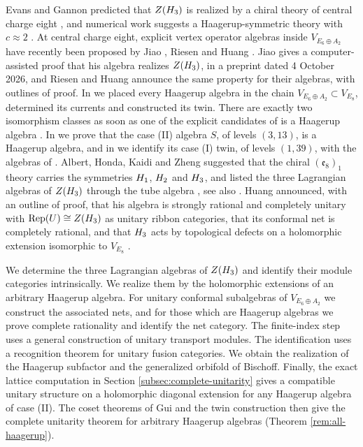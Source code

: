 \documentclass[leqno]{article}
\let\cal\relax
\newcommand{\cal}{\mathcal}
\DeclareMathOperator{\Rep}{Rep} %
\numberwithin{equation}{section}
\begin{document}
Evans and Gannon predicted that $Z(\cal H_3)$ is realized by a chiral theory of central charge eight \cite{EvG11}, and numerical work suggests a Haagerup-symmetric theory with $c \approx 2$ \cite{HL+22,V+22}. At central charge eight, explicit vertex operator algebras inside $V_{E_6 \oplus A_2}$ have recently been proposed by Jiao \cite{Jia26}, Riesen \cite{Rie26} and Huang \cite{Hua26}. Jiao gives a computer-assisted proof that his algebra realizes $Z(\cal H_3)$, in a preprint dated 4 October 2026, and Riesen and Huang announce the same property for their algebras, with outlines of proof. In \cite{Arh26} we placed every Haagerup algebra in the chain $V_{E_6 \oplus A_2} \subset V_{E_8}$, determined its currents and constructed its twin. There are exactly two isomorphism classes as soon as one of the explicit candidates of \cite{Jia26,Rie26} is a Haagerup algebra \cite[Theorems 12.3 and 12.4]{Arh26}. In \cite[Theorem 6.1]{ArhIII} we prove that the case (II) algebra $S$, of levels $(3,13)$, is a Haagerup algebra, and in \cite[Theorem 7.13(1)]{ArhIII} we identify its case (I) twin, of levels $(1,39)$, with the algebras of \cite{Rie26,Hua26}. Albert, Honda, Kaidi and Zheng suggested that the chiral $(\mathfrak e_8)_1$ theory carries the symmetries $\cal H_1$, $\cal H_2$ and $\cal H_3$, and listed the three Lagrangian algebras of $Z(\cal H_3)$ through the tube algebra \cite[Appendix A pp.~6--7]{AHKZ26}, see also \cite{BoS25}. Huang announced, with an outline of proof, that his algebra is strongly rational and completely unitary with $\Rep(U) \cong Z(\cal H_3)$ as unitary ribbon categories, that its conformal net is completely rational, and that $\cal H_3$ acts by topological defects on a holomorphic extension isomorphic to $V_{E_8}$ \cite[Theorem 1 p.~1 and Sections 6 and 7 pp.~8--10]{Hua26}.

We determine the three Lagrangian algebras of $Z(\cal H_3)$ and identify their module categories intrinsically. We realize them by the holomorphic extensions of an arbitrary Haagerup algebra. For unitary conformal subalgebras of $V_{E_6 \oplus A_2}$ we construct the associated nets, and for those which are Haagerup algebras we prove complete rationality and identify the net category. The finite-index step uses a general construction of unitary transport modules. The identification uses a recognition theorem for unitary fusion categories. We obtain the realization of the Haagerup subfactor and the generalized orbifold of Bischoff. Finally, the exact lattice computation in Section \ref{subsec:complete-unitarity} gives a compatible unitary structure on a holomorphic diagonal extension for any Haagerup algebra of case (II). The coset theorems of Gui and the twin construction then give the complete unitarity theorem for arbitrary Haagerup algebras (Theorem \ref{rem:all-haagerup}).
\end{document}
